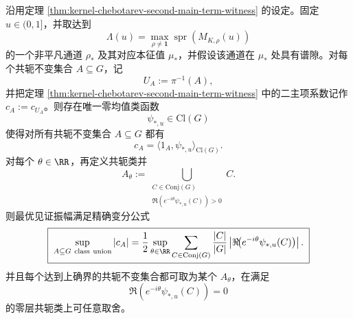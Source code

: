 \begin{theorem}[二主项最优见证集由极大通道特征函数的符号层给出]\label{thm:xi-time-part64aa-optimal-chebotarev-witness-sign-slice}
沿用定理 \ref{thm:kernel-chebotarev-second-main-term-witness} 的设定。固定 \(u\in(0,1]\)，并取达到
\[
\Lambda(u)=\max_{\rho\neq \mathbf 1}\operatorname{spr}(M_{K,\rho}(u))
\]
的一个非平凡通道 \(\rho_\ast\) 及其对应本征值 \(\mu_\ast\)，并假设该通道在 \(\mu_\ast\) 处具有谱隙。对每个共轭不变集合 \(A\subseteq G\)，记
\[
U_A:=\pi^{-1}(A),
\]
并把定理 \ref{thm:kernel-chebotarev-second-main-term-witness} 中的二主项系数记作 \(c_A:=c_{U_A}\)。则存在唯一零均值类函数
\[
\psi_{\ast,u}\in \mathrm{Cl}(G)
\]
使得对所有共轭不变集合 \(A\subseteq G\) 都有
\[
\boxed{\;
c_A=\langle 1_A,\psi_{\ast,u}\rangle_{\mathrm{Cl}(G)}.\;}
\]
对每个 \(\theta\in\RR\)，再定义共轭类并
\[
A_\theta
:=
\bigcup_{\substack{C\in \mathrm{Conj}(G)\\
\Re(e^{-i\theta}\psi_{\ast,u}(C))>0}} C.
\]
则最优见证振幅满足精确变分公式
\[
\boxed{\;
\sup_{A\subseteq G\ \mathrm{class\ union}}|c_A|
=
\frac12
\sup_{\theta\in\RR}
\sum_{C\in \mathrm{Conj}(G)}
\frac{|C|}{|G|}
\left|\Re\!\bigl(e^{-i\theta}\psi_{\ast,u}(C)\bigr)\right|.\;}
\]
并且每个达到上确界的共轭不变集合都可取为某个 \(A_\theta\)，在满足
\[
\Re(e^{-i\theta}\psi_{\ast,u}(C))=0
\]
的零层共轭类上可任意取舍。
\end{theorem}
